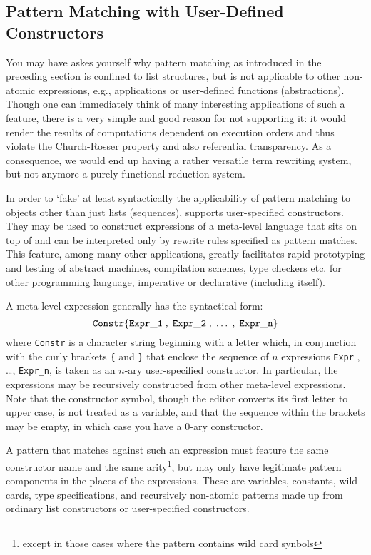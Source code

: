 \subsection{Pattern Matching with User-Defined Constructors}
You may have askes yourself why pattern matching as introduced in the preceding section
is confined to list structures, but is not applicable to other non-atomic \kir expressions,
e.g., applications or user-defined functions (abstractions). Though one can immediately
think of many interesting applications of such a feature, there is a very simple and good reason
for not supporting it: it would render the results of computations dependent on execution
orders and thus violate the {\mys Church-Rosser property} and also {\mys referential transparency}. As
a consequence, we would end up having a  rather versatile {\mys term rewriting system}, but not
anymore a purely functional reduction system. 

In order to `fake' at least syntactically the applicability
 of pattern matching
to objects other than just lists (sequences), \kir supports
 {\mys user-specified constructors}. They may be used to construct 
expressions of a {\mys meta-level language} that sits on top of \kir and can
be interpreted only by {\mys rewrite rules} specified as pattern matches. This
feature, among many other applications, greatly facilitates rapid
 prototyping and testing of abstract machines, compilation schemes, type
checkers etc.  for other programming language, imperative or declarative
 (including \kir itself).

A {\mys meta-level expression} generally  has the syntactical form:
$$
{\tt Constr\{Expr\_1\;,\; Expr\_2\;,\; \ldots\;,\; Expr\_n\}}
$$
where {\tt Constr} is a character string beginning with a letter
 which, in conjunction with the
curly brackets {\tt \{} and {\tt \}} that enclose the 
sequence of $n$ \kir expressions {\tt Expr} , \ldots , {\tt Expr\_n},
is taken as an $n$-ary user-specified constructor. In particular, 
the \kir expressions
may be recursively constructed from other meta-level expressions.
  Note that the constructor symbol, though the editor converts its 
first letter to upper case, is not treated as a variable, and that
the sequence
within the brackets may be empty, in which case you have a $0$-ary
constructor.

A pattern that matches against such an expression 
must feature the same constructor name and the same arity\footnote{except
in those cases where the pattern contains wild card synbols}, but may
only have legitimate pattern components in the places of the expressions.
These are variables, constants, wild cards, 
type specifications, and recursively 
non-atomic patterns made up from ordinary list constructors 
or user-specified constructors. 

